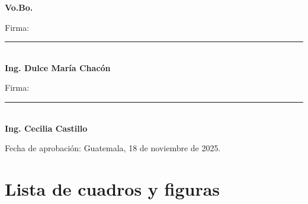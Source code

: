 \documentclass{article}
\begin{document}
\newpage
\thispagestyle{empty}
\vspace*{0.5in}

\begin{center}
\Large \textbf{Vo.Bo.}\\[1cm]
\end{center}

\begin{center}
Firma: \rule[1pt]{4in}{1pt}\\
\textbf{Ing. Dulce María Chacón}\\[1cm]
\end{center}

\vspace{1cm}

\begin{center}
Firma: \rule[1pt]{4in}{1pt}\\
\textbf{Ing. Cecilia Castillo}\\[1cm]
\end{center}

\vspace{1cm}

\begin{flushright}
Fecha de aprobación: Guatemala, 18 de noviembre de 2025.
\end{flushright}
\newpage

\tableofcontents
\newpage


\setcounter{page}{1} %

\section{Lista de cuadros y figuras}
\listoffigures  %
\newpage
















\end{document}
